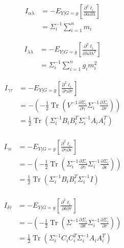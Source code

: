\documentclass[hidelinks]{article}
\DeclareMathOperator{\Tr}{Tr}
\begin{document}
\begingroup
\large
\begin{equation*}
\begin{split}
I_{\alpha\lambda} &= - E_{Y|G=g}\left[ \frac{\partial^2 \ell_i }{\partial \alpha \partial \lambda}\right]\\
&= \Sigma_i^{-1}  \sum\limits_{i=1}^n m_i
\end{split}
\end{equation*}
\endgroup

\begingroup
\large
\begin{equation*}
\begin{split}
I_{\lambda\lambda} &= - E_{Y|G=g}\left[ \frac{\partial^2 \ell_i }{\partial \lambda \partial \lambda^T}\right]\\
&= \Sigma_i^{-1}  \sum\limits_{i=1}^n g_i m_i^2
\end{split}
\end{equation*}
\endgroup


\begingroup
\large
\begin{equation*}
\begin{split}
I_{\gamma\tau} &= - E_{Y|G=g}\left[ \frac{\partial^2 \ell_i }{\partial \gamma \partial \tau}\right]\\
&= - \left(-\frac{1}{2} \Tr\left(V^{-1}\frac{\partial \Sigma_i }{\partial \gamma} \Sigma_i^{-1}\frac{\partial \Sigma_i }{\partial \tau} \right) \right)\\
&= \frac{1}{2} \Tr \left(\Sigma_i^{-1} B_i B_i^T \Sigma_i^{-1} A_i A_i^T \right)\\
\end{split}
\end{equation*}
\endgroup

\begingroup
\large
\begin{equation}
\begin{split}
I_{\gamma\epsilon} &= - E_{Y|G=g}\left[ \frac{\partial^2 \ell_i }{\partial \gamma \partial \epsilon}\right]\\
&= - \left(-\frac{1}{2} \Tr\left(\Sigma_i^{-1}\frac{\partial \Sigma_i }{\partial \gamma} \Sigma_i^{-1}\frac{\partial \Sigma_i }{\partial \epsilon} \right) \right)\\
&= \frac{1}{2} \Tr \left(\Sigma_i^{-1} B_i B_i^T \Sigma_i^{-1}I \right)\\
\end{split}
\end{equation}
\endgroup

\begingroup
\large
\begin{equation*}
\begin{split}
I_{\delta\tau} &= - E_{Y|G=g}\left[ \frac{\partial^2 \ell_i }{\partial \delta \partial \tau}\right]\\
&= - \left(-\frac{1}{2} \Tr\left(\Sigma^{-1}\frac{\partial \Sigma_i }{\partial \delta} \Sigma_i^{-1}\frac{\partial \Sigma_i }{\partial \tau} \right) \right)\\
&= \frac{1}{2} \Tr \left(\Sigma_i^{-1} C_i C_i^T \Sigma_i^{-1} A_i A_i^T \right)\\
\end{split}
\end{equation*}
\endgroup
\end{document}
